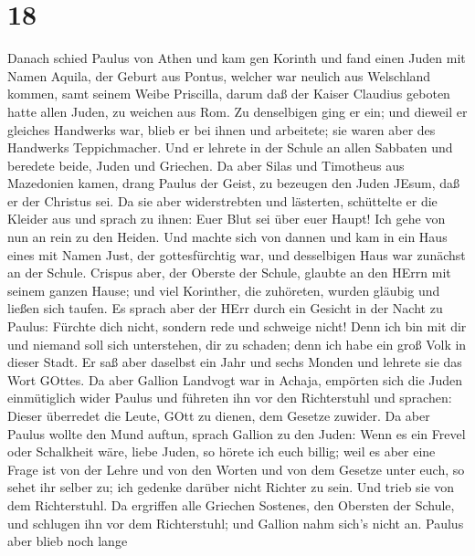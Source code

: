 \hypertarget{section-17}{%
\section{18}\label{section-17}}

 Danach schied Paulus von Athen und kam gen Korinth
 und fand einen Juden mit Namen Aquila, der Geburt aus
Pontus, welcher war neulich aus Welschland kommen, samt seinem Weibe
Priscilla, darum daß der Kaiser Claudius geboten hatte allen Juden, zu
weichen aus Rom.  Zu denselbigen ging er ein; und dieweil er
gleiches Handwerks war, blieb er bei ihnen und arbeitete; sie waren aber
des Handwerks Teppichmacher.  Und er lehrete in der Schule
an allen Sabbaten und beredete beide, Juden und Griechen. 
Da aber Silas und Timotheus aus Mazedonien kamen, drang Paulus der
Geist, zu bezeugen den Juden JEsum, daß er der Christus sei.
 Da sie aber widerstrebten und lästerten, schüttelte er die
Kleider aus und sprach zu ihnen: Euer Blut sei über euer Haupt! Ich gehe
von nun an rein zu den Heiden.  Und machte sich von dannen
und kam in ein Haus eines mit Namen Just, der gottesfürchtig war, und
desselbigen Haus war zunächst an der Schule.  Crispus aber,
der Oberste der Schule, glaubte an den HErrn mit seinem ganzen Hause;
und viel Korinther, die zuhöreten, wurden gläubig und ließen sich
taufen.  Es sprach aber der HErr durch ein Gesicht in der
Nacht zu Paulus: Fürchte dich nicht, sondern rede und schweige nicht!
 Denn ich bin mit dir und niemand soll sich unterstehen,
dir zu schaden; denn ich habe ein groß Volk in dieser Stadt.
 Er saß aber daselbst ein Jahr und sechs Monden und lehrete
sie das Wort GOttes.  Da aber Gallion Landvogt war in
Achaja, empörten sich die Juden einmütiglich wider Paulus und führeten
ihn vor den Richterstuhl  und sprachen: Dieser überredet
die Leute, GOtt zu dienen, dem Gesetze zuwider.  Da aber
Paulus wollte den Mund auftun, sprach Gallion zu den Juden: Wenn es ein
Frevel oder Schalkheit wäre, liebe Juden, so hörete ich euch billig;
 weil es aber eine Frage ist von der Lehre und von den
Worten und von dem Gesetze unter euch, so sehet ihr selber zu; ich
gedenke darüber nicht Richter zu sein.  Und trieb sie von
dem Richterstuhl.  Da ergriffen alle Griechen Sostenes, den
Obersten der Schule, und schlugen ihn vor dem Richterstuhl; und Gallion
nahm sich's nicht an.  Paulus aber blieb noch lange
